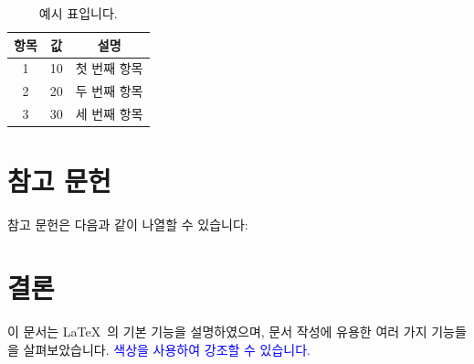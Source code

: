 \documentclass{oblivoir}
\begin{document}
 	\begin{table}[h]
 		\centering
 		\caption{예시 표입니다.}
 		\begin{tabular}{|c|c|c|} %
 			\hline
 			\textbf{항목} & \textbf{값} & \textbf{설명} \\ \hline
 			1 & 10 & 첫 번째 항목 \\ \hline
 			2 & 20 & 두 번째 항목 \\ \hline
 			3 & 30 & 세 번째 항목 \\ \hline
 		\end{tabular}
 		\label{tab:example}
 	\end{table}

 	\section{참고 문헌}
 	참고 문헌은 다음과 같이 나열할 수 있습니다:

 	\section{결론}
 	이 문서는 \LaTeX\ 의 기본 기능을 설명하였으며, 문서 작성에 유용한 여러 가지 기능들을 살펴보았습니다. \textcolor{blue}{색상을 사용하여 강조할 수 있습니다.}
\end{document}
